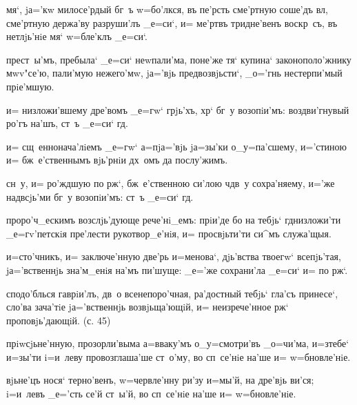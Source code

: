 мя`, jа='кw милосе'рдый бг~ъ w=бо'лкся, въ пе'рсть 
сме'ртную соше'дъ вл, сме'ртную держа'ву разруши'лъ 
_е=си`, и= ме'ртвъ тридне'венъ воскр~съ, въ нетлjь'нiе 
мя` w=бле'клъ _е=си`.

прест~ы'мъ, пребыла` _е=си` неwпали'ма, поне'же тя` 
купина` законополо'жнику мwv"се'ю, пали'мую нежего'мw, 
jа='вjь предвозвjьсти`, _о='гнь нестерпи'мый прiе'мшую.


и= низложи'вшему дре'вомъ _е=гw` грjь'хъ, хр` бг~у 
возопiи'мъ: воздви'гнувый ро'гъ на'шъ, ст~ъ _е=си` гд.

и= сщ~еннонача'лiемъ _е=гw` а=п jа='вjь jа=зы'ки 
о_у=па'сшему, и='стиною и= бж~е'ственнымъ вjь'рнiи дх~омъ 
да послу'жимъ.

сн~у, и= ро'ждшую по рж`, бж~е'ственною си'лою 
ч дв~у сохра'няему, и='же над\ъ всjь'ми бг~у 
возопiи'мъ: ст~ъ _е=си` гд.


проро'ч_ескимъ возслjь'дующе рече'нi_емъ: прiи'де бо на 
тебjь` гд низложи'ти _е=гv'петскiя пре'лести 
рукотвор_е'нiя, и= просвjьти'ти си^мъ служа'щыя.

и=сто'чникъ, и= заключе'нную две'рь и=менова`, дjь'вства 
твоегw` всепjь'тая, jа='вственнjь зна'м_енiя на'мъ 
пи'шуще: _е='же сохрани'ла _е=си` и= по рж`.

сподо'блься гаврiи'лъ, дв~о всенепоро'чная, ра'достный 
тебjь` гла'съ принесе`, сло'ва зача'тiе jа='вственнjь 
возвjьща'ющiй, и= неизрече'нное рж` проповjь'дающiй. 
(с. 45)


прiwсjьне'нную, прозорли'выма а=вваку'мъ о_у=смотри'въ 
_о=чи'ма, и=з\ъ тебе` и=зы'ти i=и~леву провозглаша'ше 
ст~о'му, во сп~се'нiе на'ше и= w=бновле'нiе.

вjьне'цъ нося` терно'венъ, w=червле'нну ри'зу и=мы'й, на 
дре'вjь ви'ся; i=и~левъ _е='сть се'й ст~ы'й, во сп~се'нiе 
на'ше и= w=бновле'нiе.

